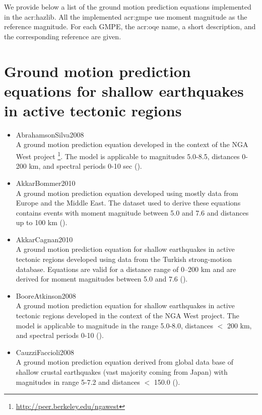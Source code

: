 We provide below a list of the ground motion prediction equations implemented
in the \gls{acr:hazlib}. All the implemented \gls{acr:gmpe} use moment
magnitude as the reference magnitude. For each GMPE, the \gls{acr:oqe} name, a
short description, and the corresponding reference are given.


\section[GMPEs for shallow earthquakes in active tectonic regions]{Ground motion prediction equations for shallow earthquakes in active tectonic regions}

\begin{itemize}

\item AbrahamsonSilva2008 \hfill \\ A ground motion prediction equation
developed in the context of the NGA West project \footnote{\href{http://peer.
berkeley.edu/ngawest/}{http://peer.berkeley.edu/ngawest}}. The model is
applicable to magnitudes 5.0-8.5, distances 0-200 km, and spectral periods 0-10
sec (\cite{abrahamson2008}).

\item AkkarBommer2010 \hfill \\ A ground motion prediction equation developed
using mostly data from Europe and the Middle East. The dataset used to derive
these equations contains events with moment magnitude between 5.0 and 7.6 and
distances up to 100 km (\cite{akkar2010}).

\item AkkarCagnan2010 \hfill \\ A ground motion prediction equation for
shallow earthquakes in active tectonic regions developed using data from the
Turkish strong-motion database. Equations are valid for a distance range of
0–200 km and are derived for moment magnitudes between 5.0 and 7.6
(\cite{akkar2010a}).

\item BooreAtkinson2008 \hfill \\ A ground motion prediction equation for
shallow earthquakes in active tectonic regions developed in the context of the
NGA West project. The model is applicable to magnitude in the range 5.0-8.0,
distances $<$ 200 km, and spectral periods 0-10 (\cite{boore2008}).

\item CauzziFaccioli2008 \hfill \\ A ground motion prediction equation derived
from global data base of shallow crustal earthquakes (vast majority coming
from Japan) with magnitudes in range 5-7.2 and distances $<$ 150.0
(\cite{cauzzi2008}).


\end{itemize}
